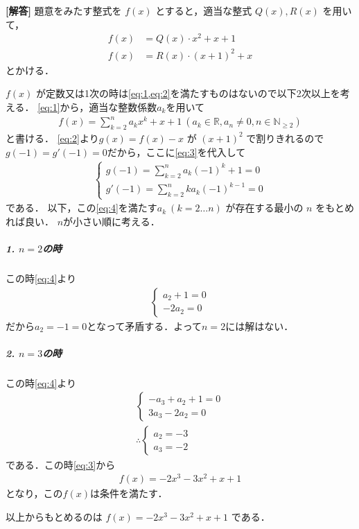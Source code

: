 \documentclass[../../main.tex]{subfiles}
\begin{document}
\begin{oframed}
  
\end{oframed}

{\bf [解答]}
題意をみたす整式を $f(x)$ とすると，適当な整式 $Q(x), R(x)$ を用いて，
\begin{align}
  f(x) &= Q(x) \cdot x^2 + x + 1\label{eq:1} \\
  f(x) &= R(x) \cdot (x+1)^2 + x\label{eq:2}
\end{align}
とかける．

$f(x)$ が定数又は1次の時は\cref{eq:1,eq:2}を満たすものはないので以下2次以上を考える．
\cref{eq:1}から，適当な整数係数$a_k$を用いて
\begin{align}
  f(x) = \sum_{k=2}^n a_k x^k + x + 1 \ (a_k \in \mathbb{R}, a_n \neq 0, n \in \mathbb{N}_{\ge 2}) \label{eq:3}
\end{align}
と書ける．
\cref{eq:2}より$g(x) = f(x) - x$ が $(x+1)^2$ で割りきれるので$g(-1) = g'(-1) = 0$だから，ここに\cref{eq:3}を代入して
\begin{align}
  \begin{cases}
    g(-1) = \sum_{k=2}^n a_k (-1)^k + 1 = 0 \\
    g'(-1) = \sum_{k=2}^n k a_k (-1)^{k-1} = 0
  \end{cases} \label{eq:4}
\end{align}
である．
以下，この\cref{eq:4}を満たす$a_k \ (k=2 \dots n)$ が存在する最小の $n$ をもとめれば良い．
$n$が小さい順に考える．

\subparagraph{1. $n=2$の時}
この時\cref{eq:4}より
\begin{align}
  \begin{cases}
    a_2 + 1 = 0 \\
    -2a_2 = 0
  \end{cases}
\end{align}
だから$a_2=-1=0$となって矛盾する．よって$n=2$には解はない．

\subparagraph{2. $n=3$の時}
この時\cref{eq:4}より
\begin{align}
  \begin{cases}
    -a_3 + a_2 + 1 = 0 \\
    3a_3 - 2a_2 = 0
  \end{cases} \\
  \therefore
  \begin{cases}
    a_2 = -3 \\
    a_3 = -2
  \end{cases}
\end{align}
である．この時\cref{eq:3}から
\begin{align}
  f(x) = -2x^3 - 3x^2 + x + 1
\end{align}
となり，この$f(x)$は条件を満たす．
\casesend

以上からもとめるのは $f(x) = -2x^3 - 3x^2 + x + 1$ である．

\newpage
\end{document}
